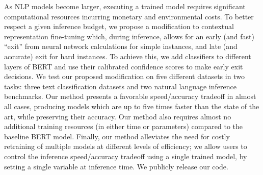 As NLP models become larger, executing a trained model requires significant computational resources incurring monetary and environmental costs. To better respect a given inference budget, we propose a modification to contextual representation fine-tuning which, during inference, allows for an early (and fast) ``exit'' from neural network calculations for simple instances, and late (and accurate) exit for hard instances. To achieve this, we add classifiers to different layers of BERT and use their calibrated confidence scores to make early exit decisions. We test our proposed modification on five different datasets in two tasks: three text classification datasets and two natural language inference benchmarks. Our method presents a favorable speed/accuracy tradeoff in almost all cases, producing models which are up to five times faster than the state of the art, while preserving their accuracy. Our method also requires almost no additional training resources (in either time or parameters) compared to the baseline BERT model. Finally, our method alleviates the need for costly retraining of multiple models at different levels of efficiency; we allow users to control the inference speed/accuracy tradeoff using a single trained model, by setting a single variable at inference time. We publicly release our code.
